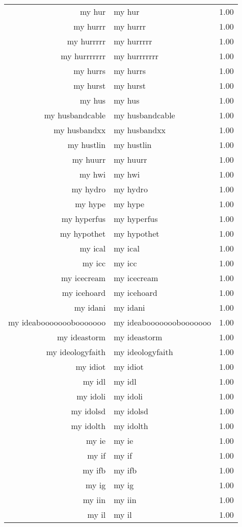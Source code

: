 \begin{table}[ht]
\begin{tabular}{rlr}
  my hur & my hur & 1.00 \\ 
  my hurrr & my hurrr & 1.00 \\ 
  my hurrrrr & my hurrrrr & 1.00 \\ 
  my hurrrrrrr & my hurrrrrrr & 1.00 \\ 
  my hurrs & my hurrs & 1.00 \\ 
  my hurst & my hurst & 1.00 \\ 
  my hus & my hus & 1.00 \\ 
  my husbandcable & my husbandcable & 1.00 \\ 
  my husbandxx & my husbandxx & 1.00 \\ 
  my hustlin & my hustlin & 1.00 \\ 
  my huurr & my huurr & 1.00 \\ 
  my hwi & my hwi & 1.00 \\ 
  my hydro & my hydro & 1.00 \\ 
  my hype & my hype & 1.00 \\ 
  my hyperfus & my hyperfus & 1.00 \\ 
  my hypothet & my hypothet & 1.00 \\ 
  my ical & my ical & 1.00 \\ 
  my icc & my icc & 1.00 \\ 
  my icecream & my icecream & 1.00 \\ 
  my icehoard & my icehoard & 1.00 \\ 
  my idani & my idani & 1.00 \\ 
  my ideabooooooobooooooo & my ideabooooooobooooooo & 1.00 \\ 
  my ideastorm & my ideastorm & 1.00 \\ 
  my ideologyfaith & my ideologyfaith & 1.00 \\ 
  my idiot & my idiot & 1.00 \\ 
  my idl & my idl & 1.00 \\ 
  my idoli & my idoli & 1.00 \\ 
  my idolsd & my idolsd & 1.00 \\ 
  my idolth & my idolth & 1.00 \\ 
  my ie & my ie & 1.00 \\ 
  my if & my if & 1.00 \\ 
  my ifb & my ifb & 1.00 \\ 
  my ig & my ig & 1.00 \\ 
  my iin & my iin & 1.00 \\ 
  my il & my il & 1.00 \\ 

\end{tabular}
\end{table}
